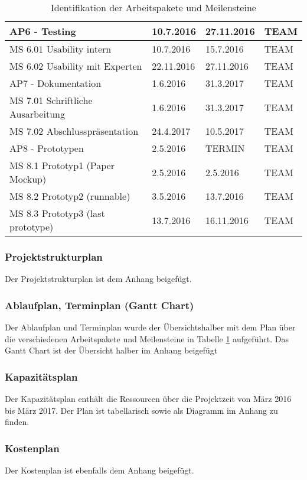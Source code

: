 \begin{table}
\begin{tabular}{|l|l|l|l|}
		\hline
		AP6 - Testing & 10.7.2016 & 27.11.2016 & TEAM\\
 		\hline
		MS 6.01 Usability intern & 10.7.2016 & 15.7.2016 & TEAM\\
 		\hline
		MS 6.02 Usability mit Experten &22.11.2016 & 27.11.2016 &TEAM\\
 		\hline
		AP7 - Dokumentation &1.6.2016 & 31.3.2017 & TEAM\\
 		\hline
		MS 7.01 Schriftliche Ausarbeitung & 1.6.2016 & 31.3.2017 & TEAM\\
 		\hline
		MS 7.02 Abschlusspräsentation & 24.4.2017 & 10.5.2017 & TEAM\\
 		\hline
		AP8 - Prototypen & 2.5.2016 & TERMIN & TEAM\\
 		\hline
		MS 8.1 Prototyp1 (Paper Mockup) & 2.5.2016 & 2.5.2016 & TEAM\\
 		\hline
		MS 8.2 Prototyp2 (runnable) & 3.5.2016 & 13.7.2016 & TEAM\\
 		\hline
		MS 8.3 Prototyp3 (last prototype) & 13.7.2016 & 16.11.2016 & TEAM\\
 		\hline
				
	\end{tabular}
	\caption{Identifikation der Arbeitspakete und Meilensteine}
	\label{tab:APMS}
\end{table}

\subsubsection{Projektstrukturplan}
Der Projektstrukturplan ist dem Anhang beigefügt.


\subsubsection{Ablaufplan, Terminplan (Gantt Chart)}
Der Ablaufplan und Terminplan wurde der Übersichtshalber mit dem Plan über die verschiedenen Arbeitspakete und Meilensteine in Tabelle \ref{tab:APMS} aufgeführt. Das Gantt Chart ist der Übersicht halber im Anhang beigefügt
\subsubsection{Kapazitätsplan}
Der Kapazitätsplan enthält die Ressourcen über die Projektzeit von März 2016 bis März 2017. Der Plan ist tabellarisch sowie als Diagramm im Anhang zu finden.

\subsubsection{Kostenplan}
Der Kostenplan ist ebenfalls dem Anhang beigefügt.

